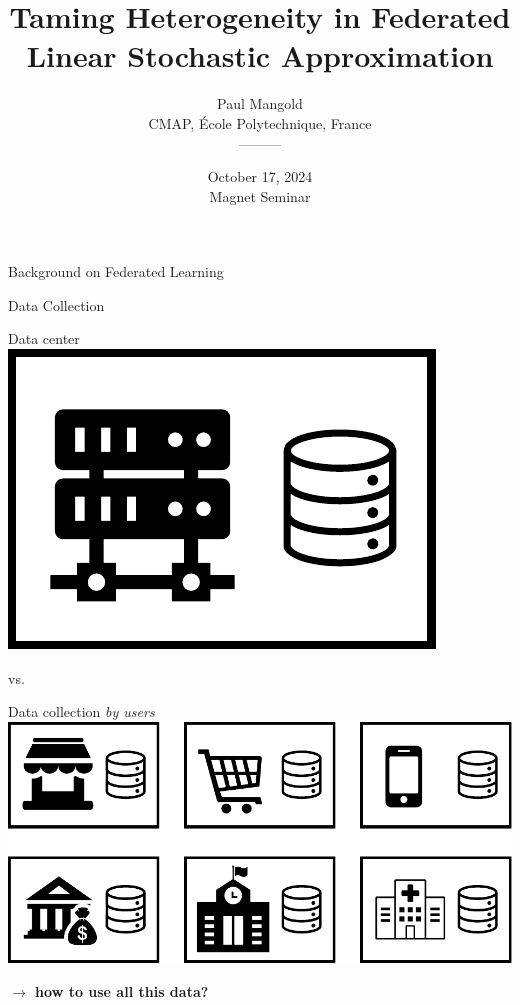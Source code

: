 \documentclass[aspectratio=169,14pt]{beamer}
\title{Taming Heterogeneity in Federated Linear Stochastic Approximation}
\author{
  \vspace{-0.5em}
  Paul Mangold\\[0.5em]
  CMAP, École Polytechnique, France\\[0.5em]
  ---------\\
  \vspace{-1em}
}
\institute{}
\date{October 17, 2024 \\
Magnet Seminar}
\begin{document}

\begin{frame}[plain]
  \titlepage
\end{frame}
\addtocounter{framenumber}{-1}

\begin{frame}
  \begin{center}
    \textcolor{beamer@blendedblue}{
      \huge Background on Federated Learning
    }
  \end{center}
\end{frame}

\begin{frame}{Data Collection}
  \hspace{-3em}
  \begin{minipage}{0.5\linewidth}
    \begin{center}
      Data center\\[0.5em]
      
      \includegraphics[width=0.4\linewidth]{images/central.pdf}
    \end{center}
    
  \end{minipage}\pause vs.\hspace{1.5em}%
  \begin{minipage}{0.5\linewidth}
    \pause
    \begin{center}
      Data collection \emph{by users} \\[0.5em]
      
      \includegraphics[width=0.8\linewidth]{images/decentralized.pdf}
    \end{center}
  \end{minipage}

  \vspace{1em}

  \pause
  
  \begin{center}
    \textbf{
    $\rightarrow$ how to use all this data?}
  \end{center}
\end{frame}
\end{document}
